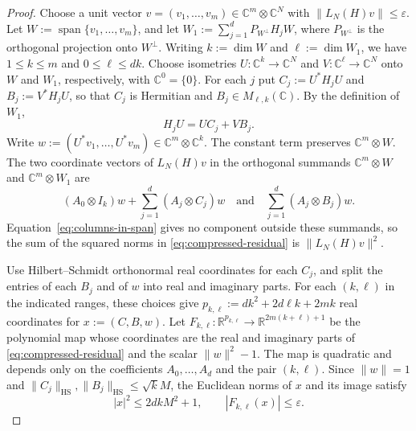 \begin{proof}
Choose a unit vector $v=(v_1,\ldots,v_m)\in\mathbb C^m\otimes\mathbb C^N$ with $\|L_N(H)v\|\le\varepsilon$.
Let $W:=\operatorname{span}\{v_1,\ldots,v_m\}$, and let $W_1:=\sum_{j=1}^d P_{W^\perp}H_jW$, where $P_{W^\perp}$ is the orthogonal projection onto $W^\perp$.
Writing $k:=\dim W$ and $\ell:=\dim W_1$, we have $1\le k\le m$ and $0\le\ell\le dk$.
Choose isometries $U:\mathbb C^k\to\mathbb C^N$ and $V:\mathbb C^\ell\to\mathbb C^N$ onto $W$ and $W_1$, respectively, with $\mathbb C^0=\{0\}$.
For each $j$ put $C_j:=U^*H_jU$ and $B_j:=V^*H_jU$, so that $C_j$ is Hermitian and $B_j\in M_{\ell,k}(\mathbb C)$.
By the definition of $W_1$,
\begin{equation}\label{eq:columns-in-span}
 H_jU=UC_j+VB_j.
\end{equation}
Write $w:=(U^*v_1,\ldots,U^*v_m)\in\mathbb C^m\otimes\mathbb C^k$.
The constant term preserves $\mathbb C^m\otimes W$.
The two coordinate vectors of $L_N(H)v$ in the orthogonal summands $\mathbb C^m\otimes W$ and $\mathbb C^m\otimes W_1$ are
\begin{equation}\label{eq:compressed-residual}
 (A_0\otimes I_k)w+\sum_{j=1}^d(A_j\otimes C_j)w
 \quad\text{and}\quad
 \sum_{j=1}^d(A_j\otimes B_j)w.
\end{equation}
Equation~\eqref{eq:columns-in-span} gives no component outside these summands, so the sum of the squared norms in \eqref{eq:compressed-residual} is $\|L_N(H)v\|^2$.

Use Hilbert--Schmidt orthonormal real coordinates for each $C_j$, and split the entries of each $B_j$ and of $w$ into real and imaginary parts.
For each $(k,\ell)$ in the indicated ranges, these choices give $p_{k,\ell}:=dk^2+2d\ell k+2mk$ real coordinates for $x:=(C,B,w)$.
Let $F_{k,\ell}:\mathbb R^{p_{k,\ell}}\to\mathbb R^{2m(k+\ell)+1}$ be the polynomial map whose coordinates are the real and imaginary parts of \eqref{eq:compressed-residual} and the scalar $\|w\|^2-1$.
The map is quadratic and depends only on the coefficients $A_0,\ldots,A_d$ and the pair $(k,\ell)$.
Since $\|w\|=1$ and $\|C_j\|_{\mathrm{HS}},\|B_j\|_{\mathrm{HS}}\le\sqrt{k}M$, the Euclidean norms of $x$ and its image satisfy
\begin{equation}\label{eq:compressed-input-bounds}
 |x|^2\le 2dkM^2+1,
 \qquad
 |F_{k,\ell}(x)|\le\varepsilon.
\end{equation}


\end{proof}
